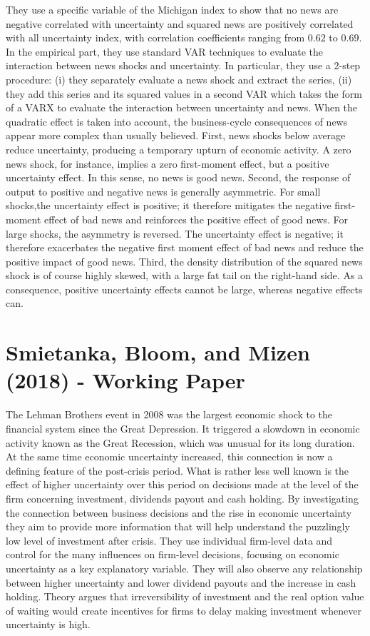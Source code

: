 \documentclass{article}
\begin{document}
{They use a specific variable of the Michigan index to show that no news are negative correlated with uncertainty and squared news are positively correlated with all uncertainty index, with correlation coefficients ranging from $0.62$ to $0.69$. In the empirical part, they use standard VAR techniques to evaluate the interaction between news shocks and uncertainty. In particular, they use a 2-step procedure: (i) they separately evaluate a news shock and extract the series, (ii) they add this series and its squared values in a second VAR which takes the form of a VARX to evaluate the interaction between uncertainty and news. When the quadratic effect is taken into account, the business-cycle consequences of news appear more complex than usually believed. First, news shocks below average reduce uncertainty, producing a temporary upturn of economic activity. A zero news shock, for instance, implies a zero first-moment effect, but a positive uncertainty effect. In this sense, no news is good news. Second, the response of output to positive and negative news is generally asymmetric. For small shocks,the uncertainty effect is positive; it therefore mitigates the negative first-moment effect of bad news and reinforces the positive effect of good news. For large shocks, the asymmetry is reversed. The uncertainty effect is negative; it therefore exacerbates the negative first moment effect of bad news and reduce the positive impact of good news. Third, the density distribution of the squared news shock is of course highly skewed, with a large fat tail on the right-hand side. As a consequence, positive uncertainty effects cannot be large, whereas negative effects can.

\section{Smietanka, Bloom, and Mizen (2018) - Working Paper}

The Lehman Brothers event in 2008 was the largest economic shock to the financial system since the Great Depression. It triggered a slowdown in economic activity known as the Great Recession, which was unusual for its long duration. At the same time economic uncertainty increased, this connection is now a defining feature of the post-crisis period. What is rather less well known is the effect of higher uncertainty over this period on decisions made at the level of the firm concerning investment, dividends payout and cash holding. By investigating the connection between business decisions and the rise in economic uncertainty they aim to provide more information that will help understand the puzzlingly low level of investment after crisis. They use individual firm-level data and control for the many influences on firm-level decisions, focusing on economic uncertainty as a key explanatory variable. They will also observe any relationship between higher uncertainty and lower dividend payouts and the increase in cash holding. Theory argues that irreversibility of investment and the real option value of waiting would create incentives for firms to delay making investment whenever uncertainty is high. 

}
\end{document}
